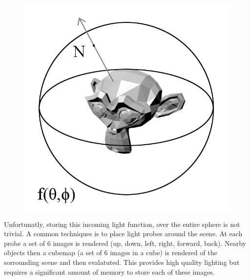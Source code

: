 \documentclass{article}
\theoremstyle{definition}
\theoremstyle{definition}
\begin{document}
\begin{figure}[h]
    \includegraphics[scale=0.35]{sphere-function}
    \centering
\end{figure}

Unfortunatly, storing this incoming light function, over the entire sphere is not trivial. A common techniques is to place light probes around the scene. At each probe a set of 6 images is rendered (up, down, left, right, forward, back). Nearby objects then  a cubemap (a set of 6 images in a cube) is rendered of the sorrounding scene and then evalatuted. This provides high quality lighting but requires a significant amount of memory to store each of these images.
\end{document}
